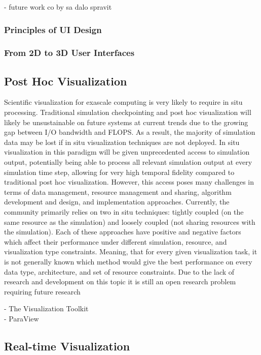 - future work co by sa dalo spravit

\subsubsection{Principles of UI Design}

\subsubsection{From 2D to 3D User Interfaces}

\subsection{Post Hoc Visualization}

Scientific visualization for exascale computing is very likely to require in situ processing. Traditional simulation checkpointing and post hoc visualization will likely be unsustainable on future systems at current trends due to the growing gap between I/O bandwidth and FLOPS. As a result, the majority of simulation data may be lost if in situ visualization techniques are not deployed. In situ visualization in this paradigm will be given unprecedented access to simulation output, potentially being able to process all relevant simulation output at every simulation time step, allowing for very high temporal fidelity compared to traditional post hoc visualization. However, this access poses many
challenges in terms of data management, resource management and sharing, algorithm development and design, and implementation approaches. Currently, the community primarily relies on two in situ techniques: tightly coupled (on the same resource
as the simulation) and loosely coupled (not sharing resources with the simulation). Each of these approaches have positive and negative factors which affect their performance under different simulation, resource, and visualization type constraints. Meaning, that for every given visualization task, it is not generally known which method would give the best performance on every data type, architecture, and set of resource constraints. Due to the
lack of research and development on this topic it is still an open research problem requiring future research
\cite{Kepler2017InSV}

- The Visualization Toolkit \\
- ParaView \\


\subsection{Real-time Visualization}
\label{rt-viz}

